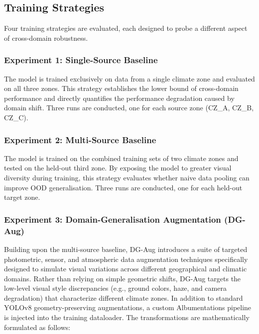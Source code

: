 \documentclass[12pt,a4paper]{article}
\begin{document}
\subsection{Training Strategies}

Four training strategies are evaluated, each designed to probe a different aspect of cross-domain robustness.

\subsubsection{Experiment 1: Single-Source Baseline}

The model is trained exclusively on data from a single climate zone and evaluated on all three zones. This strategy establishes the lower bound of cross-domain performance and directly quantifies the performance degradation caused by domain shift. Three runs are conducted, one for each source zone (CZ\_A, CZ\_B, CZ\_C).

\subsubsection{Experiment 2: Multi-Source Baseline}

The model is trained on the combined training sets of two climate zones and tested on the held-out third zone. By exposing the model to greater visual diversity during training, this strategy evaluates whether naive data pooling can improve OOD generalisation. Three runs are conducted, one for each held-out target zone.

\subsubsection{Experiment 3: Domain-Generalisation Augmentation (DG-Aug)}
\label{subsubsec:dg_aug}

Building upon the multi-source baseline, DG-Aug introduces a suite of targeted photometric, sensor, and atmospheric data augmentation techniques specifically designed to simulate visual variations across different geographical and climatic domains. Rather than relying on simple geometric shifts, DG-Aug targets the low-level visual style discrepancies (e.g., ground colors, haze, and camera degradation) that characterize different climate zones. In addition to standard YOLOv8 geometry-preserving augmentations, a custom Albumentations pipeline~\cite{buslaev2020albumentations} is injected into the training dataloader. The transformations are mathematically formulated as follows:
\end{document}
